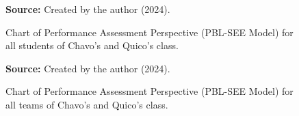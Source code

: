 \begin{figure}[ht!]
\centering

\caption{\textmd{Chart of Performance Assessment Perspective (\acrshort{PBL-SEE} Model) for all students of Chavo's and Quico's class.}}
\label{fig:pbl-see_performance_general}

\par\medskip\ABNTEXfontereduzida\selectfont\textbf{Source:} Created by the author (2024).
\end{figure}

\begin{figure}[ht!]
\centering

\caption{\textmd{Chart of Performance Assessment Perspective (\acrshort{PBL-SEE} Model) for all teams of Chavo's and Quico's class.}}
\label{fig:pbl-see_performance_all-teams}

\par\medskip\ABNTEXfontereduzida\selectfont\textbf{Source:} Created by the author (2024).
\end{figure}

